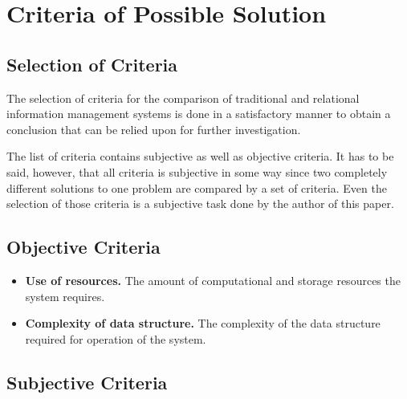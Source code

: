 \section{Criteria of Possible Solution}


\iffalse
\subsection{Selection of Criteria}

The selection of criteria for the comparison of traditional and relational information management systems is done in a satisfactory manner to obtain a conclusion that can be relied upon for further investigation.

The list of criteria contains subjective as well as objective criteria. It has to be said, however, that all criteria is subjective in some way since two completely different solutions to one problem are compared by a set of criteria. Even the selection of those criteria is a subjective task done by the author of this paper.

\subsection{Objective Criteria}

\begin{itemize}
\item \textbf{Use of resources.} The amount of computational and storage resources the system requires.
\item \textbf{Complexity of data structure.} The complexity of the data structure required for operation of the system.
\end{itemize}

\subsection{Subjective Criteria}

